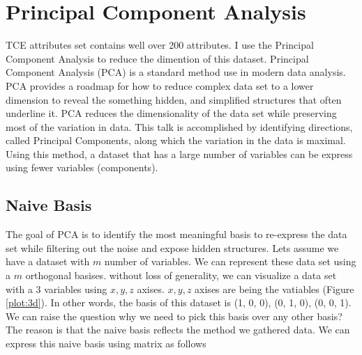 
\section{Principal Component Analysis}
TCE attributes set contains well over 200 attributes. I use the Principal Component Analysis to reduce the dimention of this dataset. Principal Component Analysis (PCA) is a standard method use in modern data analysis. PCA provides a roadmap for how to reduce complex data set to a lower dimension to reveal the something hidden, and simplified structures that often underline it. PCA reduces the dimensionality of the data set while preserving most of the variation in data. This talk is accomplished by identifying directions, called Principal Components, along which the variation in the data is maximal. Using this method, a dataset that has a large number of variables can be express using fewer variables (components). 

\subsection{Naive Basis}
 The goal of PCA is to identify the most meaningful basis to re-express the data set while filtering out the noise and expose hidden structures. Lets assume we have a dataset with $m$ number of variables. We can represent these data set using a $m$ orthogonal basises. without loss of generality, we can visualize a data set with a 3 variables using $x, y, z$ axises. $x,y,z$ axises are being the vatiables (Figure \ref{plot:3d}). In other words, the basis of this dataset is {(1, 0, 0), (0, 1, 0), (0, 0, 1)}. We can raise the question why we need to pick this basis over any other basis? The reason is that the naive basis reflects the method we gathered data. We can express this naive basis using matrix as follows 


